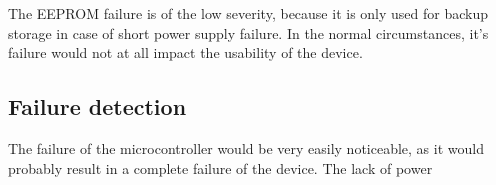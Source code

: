 \documentclass[10pt]{article}
\begin{document}
    The EEPROM failure is of the low severity, because it is only used for backup storage in case of short power supply failure.
    In the normal circumstances, it's failure would not at all impact the usability of the device.

    \subsection{Failure detection}

    The failure of the microcontroller would be very easily noticeable, as it would probably result in a complete failure of the device.
    The lack of power 

    \nocite{*}
    
    
\end{document}
